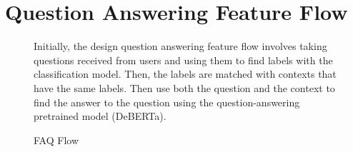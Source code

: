 \documentclass[12pt,oneside,openright,a4paper]{cpe-english-project}
\begin{document}
  \section{Question Answering Feature Flow}  
    \begin{figure}[H]
      \centering
      \caption{FAQ Flow}\label{fig:FAQ Flow}
      \begin{justify}
        \qquad Initially, the design question answering feature flow involves taking questions received from users and using them to find labels with the classification model. Then, the labels are matched with contexts that have the same labels. Then use both the question and the context to find the answer to the question using the question-answering pretrained model (DeBERTa). \par
      \end{justify}
    \end{figure}
\end{document}
